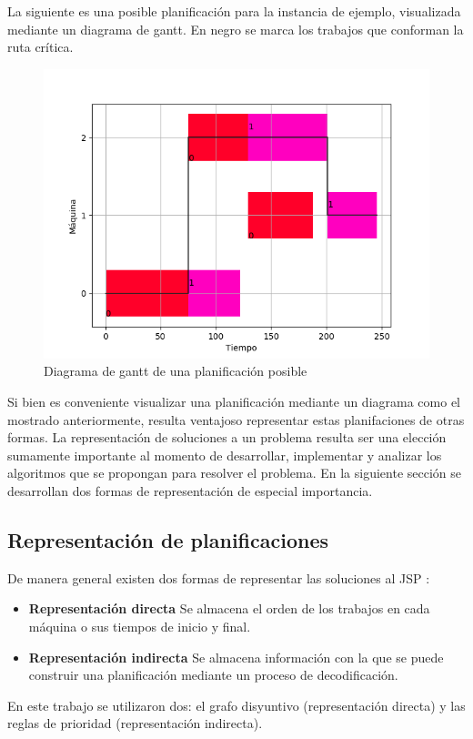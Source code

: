 La siguiente es una posible planificación para la instancia de ejemplo, visualizada mediante un diagrama de gantt. En negro se marca los trabajos que conforman la ruta crítica. 
\begin{figure}[H]
\centering
\includegraphics[scale=.7]{Imagenes/planejemplorc.png}
\caption{Diagrama de gantt de una planificación posible}
\label{fig:gantt}
\end{figure}

Si bien es conveniente visualizar una planificación mediante un diagrama como el mostrado anteriormente, resulta ventajoso representar estas planifaciones de otras formas. La representación de soluciones a un problema resulta ser una elección sumamente importante al momento de desarrollar, implementar y analizar los algoritmos que se propongan para resolver el problema. En la siguiente sección se desarrollan dos formas de representación de especial importancia.

\subsection{Representación de planificaciones}
De manera general existen dos formas de representar las soluciones al JSP \cite{Cheng1996}:
\begin{itemize}
    \item \textbf{Representación directa} Se almacena el orden de los trabajos en cada máquina o sus tiempos de inicio y final.
    \item \textbf{Representación indirecta} Se almacena información con la que se puede construir una planificación mediante un proceso de decodificación.
\end{itemize}
En este trabajo se utilizaron dos: el grafo disyuntivo (representación directa) y las reglas de prioridad (representación indirecta).
